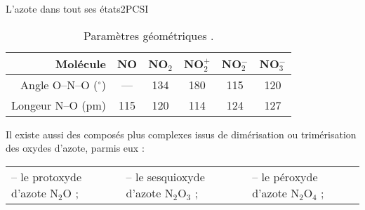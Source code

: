 \begin{exercise}{L'azote dans tout ses états}{2}{PCSI}
\begin{questions}
    
    \begin{table}[H]
    \centering
    \begin{tabularx}{.7\linewidth}{r|CCCCC}
        Molécule & NO & NO$_2$ & NO$_2^+$ & NO$_2^-$ & NO$_3^{-}$\\ \hline\hline
        Angle O--N--O ($^\circ$) & --- & 134 & 180 & 115 & 120 \\ 
        Longeur N--O (pm) & 115 & 120 & 114 & 124 & 127 \\ \hline
    \end{tabularx}
    \caption{Paramètres géométriques .}
\end{table}
    
    \question Il existe aussi des composés plus complexes issus de dimérisation ou trimérisation des oxydes d'azote, parmis eux :
    
    \begin{tabular}{lll}
        -- le protoxyde d'azote N$_2$O ; & -- le sesquioxyde d'azote N$_2$O$_3$ ; & -- le péroxyde d'azote N$_2$O$_4$ ;
    \end{tabular}


\end{questions}

\end{exercise}